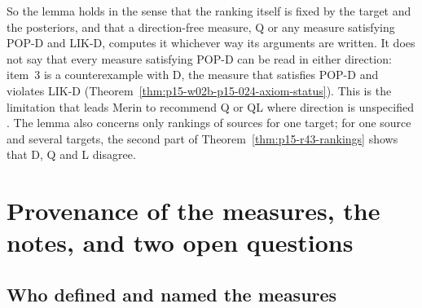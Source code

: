 So the lemma holds in the sense that the ranking itself is fixed by the
target and the posteriors, and that a direction-free measure, Q or any
measure satisfying POP-D and LIK-D, computes it whichever way its
arguments are written. It does not say that every measure satisfying
POP-D can be read in either direction: item~3 is a counterexample with
D, the measure that satisfies POP-D and violates LIK-D
(Theorem~\ref{thm:p15-w02b-p15-024-axiom-status}). This is the
limitation that leads Merin to recommend Q or QL where direction is
unspecified \cite[p.~274]{Merin2021Relevance}. The lemma also concerns
only rankings of sources for one target; for one source and several
targets, the second part of Theorem~\ref{thm:p15-r43-rankings} shows
that D, Q and L disagree.

\section{Provenance of the measures, the notes, and two open questions}
\label{sec:p15-w02b-p15-024-provenance}

\subsection{Who defined and named the measures}
\label{sec:p15-w02b-p15-024-history}

